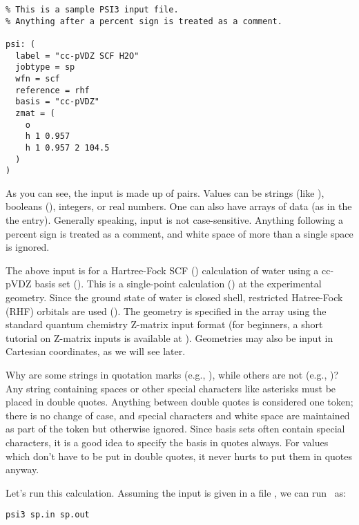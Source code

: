 \begin{verbatim}
% This is a sample PSI3 input file.
% Anything after a percent sign is treated as a comment.

psi: (
  label = "cc-pVDZ SCF H2O"
  jobtype = sp
  wfn = scf
  reference = rhf
  basis = "cc-pVDZ"
  zmat = (
    o
    h 1 0.957
    h 1 0.957 2 104.5
  )
)
\end{verbatim}

As you can see, the input is made up of  pairs.  
Values can be strings (like ), booleans 
(), integers, or real numbers.  One can 
also have arrays of data (as in the the  entry).  Generally
speaking, input is not case-sensitive.  Anything following a percent sign
is treated as a comment, and white space of more than a single space is
ignored.  

The above input is for a Hartree-Fock SCF ()
calculation of water using a cc-pVDZ basis set 
().  This is a 
single-point calculation () at the experimental 
geometry.  Since the ground state of water is closed shell, restricted 
Hatree-Fock (RHF) orbitals are used ().  
The geometry is specified in the  array using the
standard quantum chemistry Z-matrix input format (for beginners, a short
tutorial on Z-matrix inputs is available at
).  Geometries
may also be input in Cartesian coordinates, as we will see later.

Why are some strings in quotation marks (e.g., ), while others are not (e.g., )?  Any
string containing spaces or other special characters like asterisks
must be placed in double quotes.  Anything between double quotes is 
considered one token; there is no change of case, and special characters 
and white space are maintained as part of the token but otherwise ignored.
Since basis sets often contain special characters, it is a good idea to 
specify the basis in quotes always.  For values which don't have to be put 
in double quotes, it never hurts to put them in quotes anyway.

Let's run this calculation.  Assuming the input is given in a file
, we can run \PSIthree\ as:
\begin{verbatim}
psi3 sp.in sp.out
\end{verbatim}

